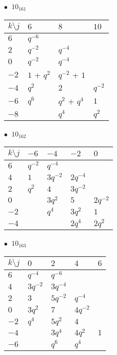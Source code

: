 %
\begin{minipage}{\linewidth}
$\bullet\ $ $10_{161}$ \vspace{0.5em} \\
\begin{tabular}{l|lll}
$k \setminus j$ & $6$ & $8$ & $10$ \\
\hline
$6$ & $q^{-6}$ &  &  \\
$2$ & $q^{-2}$ & $q^{-4}$ &  \\
$0$ & $q^{-2}$ & $q^{-4}$ &  \\
$-2$ & $1$ + $q^{2}$ & $q^{-2}$ + $1$ &  \\
$-4$ & $q^{2}$ & $2$ & $q^{-2}$ \\
$-6$ & $q^{6}$ & $q^{2}$ + $q^{4}$ & $1$ \\
$-8$ &  & $q^{4}$ & $q^{2}$ \\
\end{tabular}
\vspace{2em}
\end{minipage}
%
\begin{minipage}{\linewidth}
$\bullet\ $ $10_{162}$ \vspace{0.5em} \\
\begin{tabular}{l|llll}
$k \setminus j$ & $-6$ & $-4$ & $-2$ & $0$ \\
\hline
$6$ & $q^{-2}$ & $q^{-4}$ &  &  \\
$4$ & $1$ & $3q^{-2}$ & $2q^{-4}$ &  \\
$2$ & $q^{2}$ & $4$ & $3q^{-2}$ &  \\
$0$ &  & $3q^{2}$ & $5$ & $2q^{-2}$ \\
$-2$ &  & $q^{4}$ & $3q^{2}$ & $1$ \\
$-4$ &  &  & $2q^{4}$ & $2q^{2}$ \\
\end{tabular}
\vspace{2em}
\end{minipage}
%
\begin{minipage}{\linewidth}
$\bullet\ $ $10_{163}$ \vspace{0.5em} \\
\begin{tabular}{l|llll}
$k \setminus j$ & $0$ & $2$ & $4$ & $6$ \\
\hline
$6$ & $q^{-4}$ & $q^{-6}$ &  &  \\
$4$ & $3q^{-2}$ & $3q^{-4}$ &  &  \\
$2$ & $3$ & $5q^{-2}$ & $q^{-4}$ &  \\
$0$ & $3q^{2}$ & $7$ & $4q^{-2}$ &  \\
$-2$ & $q^{4}$ & $5q^{2}$ & $4$ &  \\
$-4$ &  & $3q^{4}$ & $4q^{2}$ & $1$ \\
$-6$ &  & $q^{6}$ & $q^{4}$ &  \\
\end{tabular}
\vspace{2em}
\end{minipage}
